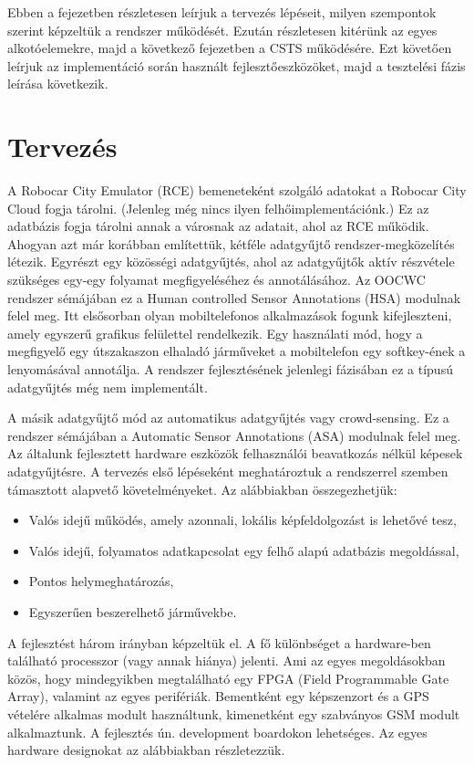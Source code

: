 \documentclass[a4paper,12pt]{report}
\begin{document}
Ebben a fejezetben részletesen leírjuk a tervezés lépéseit, milyen szempontok szerint képzeltük a rendszer működését. Ezután részletesen kitérünk az egyes alkotóelemekre, majd a következő fejezetben a CSTS működésére. Ezt követően leírjuk az implementáció során használt fejlesztőeszközöket, majd a tesztelési fázis leírása következik.

\section{Tervezés}
\label{tervezes}

A Robocar City Emulator (RCE) bemeneteként szolgáló adatokat a Robocar City Cloud fogja tárolni. (Jelenleg még nincs ilyen felhőimplementációnk.) Ez az adatbázis fogja tárolni annak a városnak az adatait, ahol az RCE működik. Ahogyan azt már korábban említettük, kétféle adatgyűjtő rendszer-megközelítés létezik. Egyrészt egy közösségi adatgyűjtés, ahol az adatgyűjtők aktív részvétele szükséges egy-egy folyamat megfigyeléséhez és annotálásához. Az OOCWC rendszer sémájában ez a Human controlled Sensor Annotations (HSA) modulnak felel meg. Itt elsősorban olyan mobiltelefonos alkalmazások fogunk kifejleszteni, amely egyszerű grafikus felülettel rendelkezik. Egy használati mód, hogy a megfigyelő egy útszakaszon elhaladó járműveket a mobiltelefon egy softkey-ének a lenyomásával annotálja. A rendszer fejlesztésének jelenlegi fázisában ez a típusú adatgyűjtés még nem implementált.

A másik adatgyűjtő mód az automatikus adatgyűjtés vagy crowd-sensing. Ez a rendszer sémájában a Automatic Sensor Annotations (ASA) modulnak felel meg. Az általunk fejlesztett hardware eszközök felhasználói beavatkozás nélkül képesek adatgyűjtésre. A tervezés első lépéseként meghatároztuk a rendszerrel szemben támasztott alapvető követelményeket. Az alábbiakban összegezhetjük:

\begin{itemize}
\item Valós idejű működés, amely azonnali, lokális képfeldolgozást is lehetővé tesz,
\item Valós idejű, folyamatos adatkapcsolat egy felhő alapú adatbázis megoldással,
\item Pontos helymeghatározás,
\item Egyszerűen beszerelhető járművekbe.
\end{itemize}

A fejlesztést három irányban képzeltük el. A fő különbséget a hardware-ben található processzor (vagy annak hiánya) jelenti. Ami az egyes megoldásokban közös, hogy mindegyikben megtalálható egy FPGA (Field Programmable Gate Array), valamint az egyes perifériák. Bementként egy képszenzort és a GPS vételére alkalmas modult használtunk, kimenetként egy szabványos GSM modult alkalmaztunk. A fejlesztés ún. development boardokon lehetséges. Az egyes hardware designokat az alábbiakban részletezzük.
\end{document}

